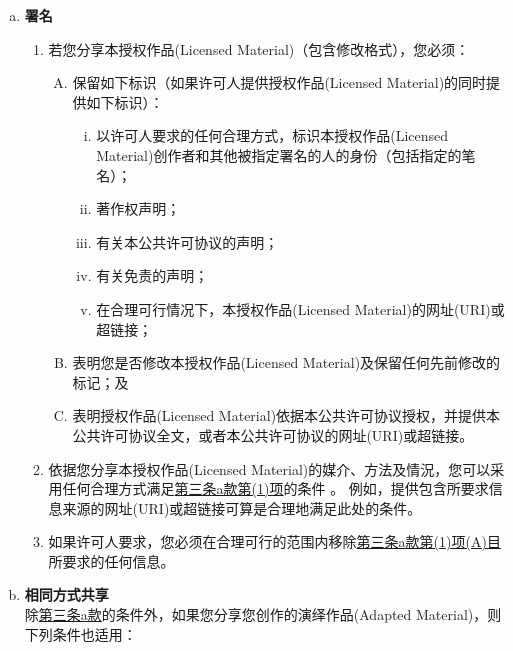 \begin{enumerate}[a.]
    \item \textbf{署名} \label{entry:A.3.a}
    \begin{enumerate}[1.]
        \item 若您分享本授权作品(Licensed Material)（包含修改格式），您必须：\label{entry:A.3.a.1}
        \begin{enumerate}[A.]
            \item 保留如下标识（如果许可人提供授权作品(Licensed Material)的同时提供如下标识）：\label{entry:A.3.a.1.A}
            \begin{enumerate}[i.]
                \item 以许可人要求的任何合理方式，标识本授权作品(Licensed Material)创作者和其他被指定署名的人的身份（包括指定的笔名）；\label{entry:A.3.a.1.A.i}
                \item 著作权声明；\label{entry:A.3.a.1.A.ii}
                \item 有关本公共许可协议的声明；\label{entry:A.3.a.1.A.iii}
                \item 有关免责的声明；\label{entry:A.3.a.1.A.iv}
                \item 在合理可行情况下，本授权作品(Licensed Material)的网址(URI)或超链接；\label{entry:A.3.a.1.A.v}
            \end{enumerate}
            \item 表明您是否修改本授权作品(Licensed Material)及保留任何先前修改的标记；及\label{entry:A.3.a.1.B}
            \item 表明授权作品(Licensed Material)依据本公共许可协议授权，并提供本公共许可协议全文，或者本公共许可协议的网址(URI)或超链接。\label{entry:A.3.a.1.C}
        \end{enumerate}
        \item 依据您分享本授权作品(Licensed Material)的媒介、方法及情況，您可以采用任何合理方式满足\hyperref[entry:A.3.a.1]{第三条a款第(1)项}的条件 。 例如，提供包含所要求信息来源的网址(URI)或超链接可算是合理地满足此处的条件。\label{entry:A.3.a.2}
        \item 如果许可人要求，您必须在合理可行的范围内移除\hyperref[entry:A.3.a.1.A]{第三条a款第(1)项(A)目}所要求的任何信息。\label{entry:A.3.a.3}
    \end{enumerate}
    \item \textbf{相同方式共享} \label{entry:A.3.b}\\
    除\hyperref[entry:A.3.a]{第三条a款}的条件外，如果您分享您创作的演绎作品(Adapted Material)，则下列条件也适用：

\end{enumerate}
